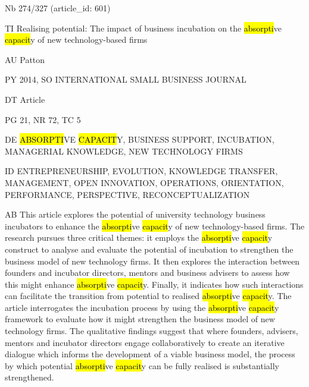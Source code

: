 \documentclass[a4paper]{article}
\begin{document}
\vspace*{-2cm}
Nb \tabto{0cm}274/327 (article\_id: 601)\par
TI \tabto{0cm}Realising potential: The impact of business incubation on the \hl{absorpti}ve \hl{capacit}y of new technology-based firms\par
AU \tabto{0cm}Patton\par
PY \tabto{0cm}2014, SO INTERNATIONAL SMALL BUSINESS JOURNAL\par
DT \tabto{0cm}Article\par
PG \tabto{0cm}21, NR 72, TC 5\par
DE \tabto{0cm}\hl{ABSORPTI}VE \hl{CAPACIT}Y, BUSINESS SUPPORT, INCUBATION, MANAGERIAL KNOWLEDGE, NEW TECHNOLOGY FIRMS\par
ID \tabto{0cm}ENTREPRENEURSHIP, EVOLUTION, KNOWLEDGE TRANSFER, MANAGEMENT, OPEN INNOVATION, OPERATIONS, ORIENTATION, PERFORMANCE, PERSPECTIVE, RECONCEPTUALIZATION\par
AB \tabto{0cm}This article explores the potential of university technology business incubators to enhance the \hl{absorpti}ve \hl{capacit}y of new technology-based firms. The research pursues three critical themes: it employs the \hl{absorpti}ve \hl{capacit}y construct to analyse and evaluate the potential of incubation to strengthen the business model of new technology firms. It then explores the interaction between founders and incubator directors, mentors and business advisers to assess how this might enhance \hl{absorpti}ve \hl{capacit}y. Finally, it indicates how such interactions can facilitate the transition from potential to realised \hl{absorpti}ve \hl{capacit}y. The article interrogates the incubation process by using the \hl{absorpti}ve \hl{capacit}y framework to evaluate how it might strengthen the business model of new technology firms. The qualitative findings suggest that where founders, advisers, mentors and incubator directors engage collaboratively to create an iterative dialogue which informs the development of a viable business model, the process by which potential \hl{absorpti}ve \hl{capacit}y can be fully realised is substantially strengthened.\par
\clearpage
\end{document}
